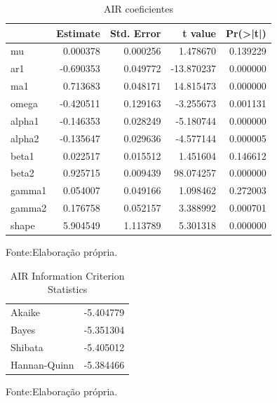 \documentclass[
  12pt,
  a4paper,
  openany]{book}
\begin{document}
\begin{table}[!h]

\caption{\label{tab:unnamed-chunk-40}AIR coeficientes}
\centering
\begin{tabular}[t]{lrrrr}
\toprule
  &  Estimate &  Std. Error &  t value & Pr(>|t|)\\
\midrule
mu & 0.000378 & 0.000256 & 1.478670 & 0.139229\\
ar1 & -0.690353 & 0.049772 & -13.870237 & 0.000000\\
ma1 & 0.713683 & 0.048171 & 14.815473 & 0.000000\\
omega & -0.420511 & 0.129163 & -3.255673 & 0.001131\\
alpha1 & -0.146353 & 0.028249 & -5.180744 & 0.000000\\
\addlinespace
alpha2 & -0.135647 & 0.029636 & -4.577144 & 0.000005\\
beta1 & 0.022517 & 0.015512 & 1.451604 & 0.146612\\
beta2 & 0.925715 & 0.009439 & 98.074257 & 0.000000\\
gamma1 & 0.054007 & 0.049166 & 1.098462 & 0.272003\\
gamma2 & 0.176758 & 0.052157 & 3.388992 & 0.000701\\
\addlinespace
shape & 5.904549 & 1.113789 & 5.301318 & 0.000000\\
\bottomrule
\end{tabular}
\end{table}
\FloatBarrier
\centering

Fonte:Elaboração própria.

\justifying
\bigskip

\begin{table}[!h]

\caption{\label{tab:unnamed-chunk-41}AIR Information Criterion Statistics}
\centering
\begin{tabular}[t]{lr}
\toprule
  & \\
\midrule
Akaike & -5.404779\\
Bayes & -5.351304\\
Shibata & -5.405012\\
Hannan-Quinn & -5.384466\\
\bottomrule
\end{tabular}
\end{table}
\FloatBarrier
\centering

Fonte:Elaboração própria.

\justifying
\bigskip
\end{document}
